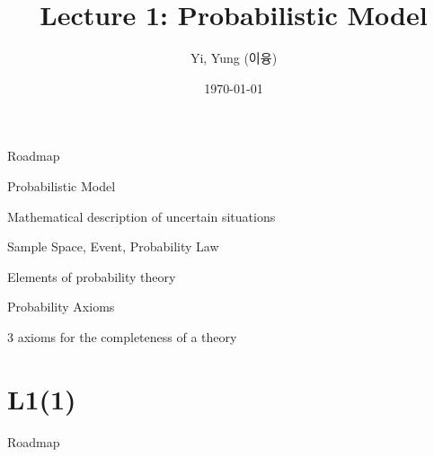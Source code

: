 

\csname\pdfmode\endcsname



\title[]{Lecture 1: Probabilistic Model}
\author{Yi, Yung (이융)}
\date{\today}









\begin{frame}
  \titlepage
\end{frame}



\begin{frame}{Roadmap}

\plitemsep 0.3in
\bce[(1)]
\item Probabilistic Model
\bci
\item Mathematical description of uncertain situations
\eci

\item Sample Space, Event, Probability Law
\bci
\item Elements of probability theory
\eci


\item Probability Axioms
\bci
\item 3 axioms for the completeness of a theory
\eci


\ece
\end{frame}

\section{L1(1)}
\begin{frame}{Roadmap}
\bce[(1)]
\item {}

\item {}
\ece
\end{frame}




